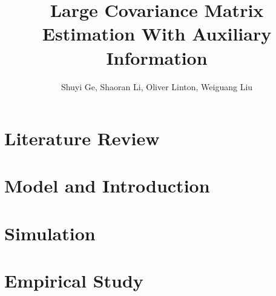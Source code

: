 \documentclass[12pt]{article}
\begin{document}
    \title{Large Covariance Matrix Estimation With Auxiliary Information}\author{Shuyi Ge, Shaoran Li, Oliver Linton, Weiguang Liu}\maketitle
    \tableofcontents
    
    \section{Literature Review}
    \section{Model and Introduction}
    \section{Simulation} 
    \section{Empirical Study}

\printbibliography
\end{document}

